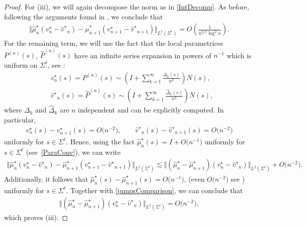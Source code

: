 \documentclass[10pt,a4paper]{amsart}
\newcommand{\Id}{I}
\newcommand{\shmu}{\widehat \mu^\star}
\newcommand{\bP}{P}
\newcommand{\hP}{{\widehat P}}
\newcommand{\sbv}{v^\star}
\newcommand{\shv}{{\widehat v^\star}}
\newcommand{\Sigl}{\Sigma^\ell}
\newcommand{\Sigr}{\Sigma^r}
\numberwithin{equation}{section}
\begin{document}
\begin{proof}
For (iii), we will again decompose the norm as in \eqref{IntDecomp}. As before, following the arguments found in \cite[Proposition~B.2]{CD}, we conclude that
\begin{align*}
\Vert \shmu_n (\sbv_n - \shv_n) - \shmu_{n+1} (\sbv_{n+1} - \shv_{n+1}) \Vert_{L^2(\Sigr)} = O\left(\frac{1}{n^{3/2}\log^2 n}\right).
\end{align*}
For the remaining term, we will use the fact that the local parametrices $\bP^{(n)}(s)$, $\hP^{(n)}(s)$ have an infinite series expansion in powers of $n^{-1}$ which is uniform on $\Sigl$, see \cite[equation~(8.2)]{KMVV}:
\begin{align*}
& v_n^\star(s)= P^{(n)}(s) \sim \left( \Id + \sum_{k=1}^\infty \frac{\Delta_k(s)}{n^k}\right) N(s),
 \\
& \shv_n(s)= \hP^{(n)}(s) \sim \left( \Id + \sum_{k=1}^\infty \frac{\widehat \Delta_k(s)}{n^k}\right) N(s),
\end{align*}
where $\Delta_k$ and $\widehat \Delta_k$ are $n$ independent and can be explicitly computed. In particular, \begin{align}\label{vinftyEst}
 \sbv_n(s) - \sbv_{n+1}(s) = O\big(n^{-2}\big), \qquad \shv_n(s) - \shv_{n+1}(s) = O\big(n^{-2}\big)
\end{align}
uniformly for $s \in \Sigl$. Hence, using the fact $\shmu_n(s) = \Id + O\big(n^{-1}\big)$ uniformly for $s \in \Sigl$ (see~\eqref{ParaConv}), we can write
\begin{align*}
 \Vert \shmu_n (\sbv_n - \shv_n) - \shmu_{n+1} (\sbv_{n+1} - \shv_{n+1}) \Vert_{L^2(\Sigl)}
 \lesssim \Vert (\shmu_n-\shmu_{n+1}) (\sbv_n-\shv_n) \Vert_{L^2(\Sigl)} + O\big(n^{-2}\big).
\end{align*}
Additionally, it follows that $\shmu_n(s)-\shmu_{n+1}(s) = O\big(n^{-1}\big)$, (even $O\big(n^{-2}\big)$ see \cite[equation~(8.7)]{KMVV}) uniformly for $s \in \Sigl$. Together with \eqref{jumpsComparison}, we can conclude that
\begin{align*}
 \Vert (\shmu_n-\shmu_{n+1}) (\sbv_n-\shv_n) \Vert_{L^2(\Sigl)} = O\big(n^{-2}\big),
\end{align*}
which proves (iii).


\end{proof}
\end{document}
